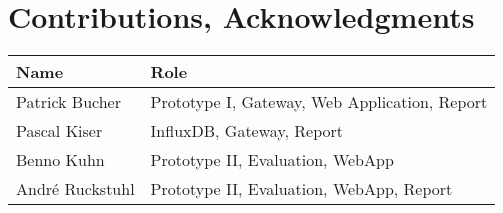 \section{Contributions, Acknowledgments}

\begin{tabular}{p{4cm}p{9cm}}
\textbf{Name} & \textbf{Role} \\
\hline
    Patrick Bucher & Prototype I, Gateway, Web Application, Report \\
    Pascal Kiser & InfluxDB, Gateway, Report \\
    Benno Kuhn &  Prototype II,  Evaluation, WebApp \\
    André Ruckstuhl & Prototype II, Evaluation, WebApp, Report \\
\end{tabular}
